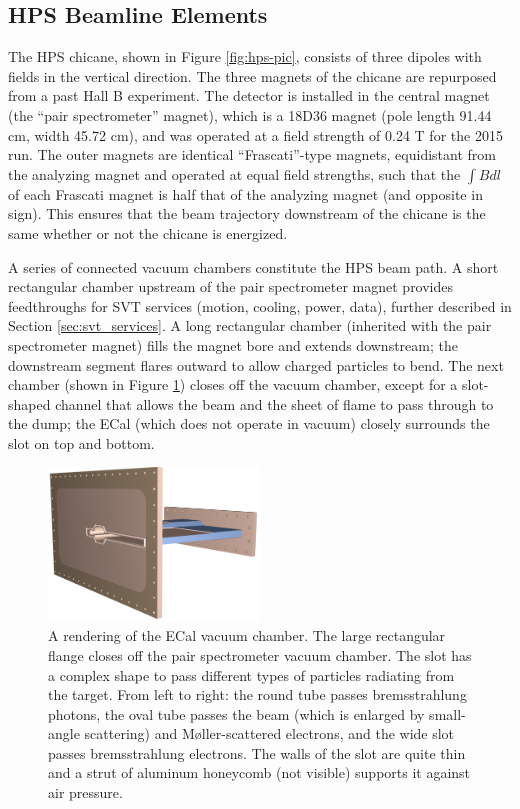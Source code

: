 \subsection{HPS Beamline Elements}

The HPS chicane, shown in Figure \ref{fig:hps-pic}, consists of three dipoles with fields in the vertical direction.
The three magnets of the chicane are repurposed from a past Hall B experiment.
The detector is installed in the central magnet (the ``pair spectrometer'' magnet), which is a 18D36 magnet (pole length 91.44 cm, width 45.72 cm), and was operated at a field strength of 0.24 T for the 2015 run.
The outer magnets are identical ``Frascati''-type magnets, equidistant from the analyzing magnet and operated at equal field strengths, such that the $\int B dl$ of each Frascati magnet is half that of the analyzing magnet (and opposite in sign).
This ensures that the beam trajectory downstream of the chicane is the same whether or not the chicane is energized.

A series of connected vacuum chambers constitute the HPS beam path.
A short rectangular chamber upstream of the pair spectrometer magnet provides feedthroughs for SVT services (motion, cooling, power, data), further described in Section \ref{sec:svt_services}.
A long rectangular chamber (inherited with the pair spectrometer magnet) fills the magnet bore and extends downstream; the downstream segment flares outward to allow charged particles to bend.
The next chamber (shown in Figure \ref{fig:ecal_chamber}) closes off the vacuum chamber, except for a slot-shaped channel that allows the beam and the sheet of flame to pass through to the dump; the ECal (which does not operate in vacuum) closely surrounds the slot on top and bottom.

\begin{figure}[htp]
    \begin{center}
        \includegraphics[width=0.5\textwidth]{detector/figs/ecal_vac}
    \end{center}
    \caption{A rendering of the ECal vacuum chamber.
    The large rectangular flange closes off the pair spectrometer vacuum chamber.
    The slot has a complex shape to pass different types of particles radiating from the target.
    From left to right: the round tube passes bremsstrahlung photons, the oval tube passes the beam (which is enlarged by small-angle scattering) and M{\o}ller-scattered electrons, and the wide slot passes bremsstrahlung electrons.
    The walls of the slot are quite thin and a strut of aluminum honeycomb (not visible) supports it against air pressure.
    }
    \label{fig:ecal_chamber}
\end{figure}

